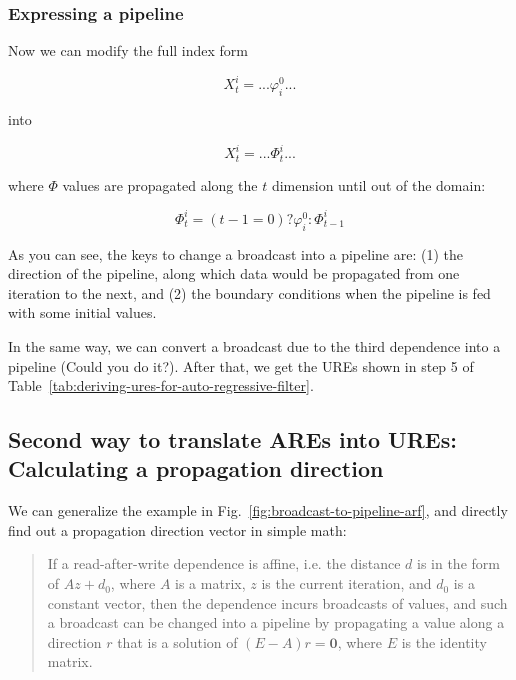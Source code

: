 \subsubsection{Expressing a pipeline} 
\label{sec:express-pipeline}

Now we can modify the full index form

\begin{equation}
X_t^i=...\varphi_i^0...
\end{equation}

into

\begin{equation}
X_t^i=...\Phi_t^i...
\end{equation}

where $\Phi$ values are propagated along the $t$ dimension until out of the domain:

\begin{equation}
\Phi_t^i=(t-1=0) ? \varphi_i^0 : \Phi_{t-1}^i
\end{equation}

As you can see, the keys to change a broadcast into a pipeline are: (1) the direction of the pipeline, along which data would be propagated from one iteration to the next, and (2) the boundary conditions when the pipeline is fed with some initial values.  

In the same way, we can convert a broadcast due to the third dependence into a pipeline (Could you do it?). After that, we get the UREs shown in step 5 of  Table~\ref{tab:deriving-ures-for-auto-regressive-filter}.

\subsection{Second way to translate AREs into UREs: Calculating a propagation direction}
\label{sec:are-to-ures-with-math}

We can generalize the example in Fig.~\ref{fig:broadcast-to-pipeline-arf}, and directly find out a propagation direction vector in simple math: 

\begin{quotation}
\noindent If a read-after-write dependence is affine, i.e. the distance $d$ is in the form of $Az+d_0$, where $A$ is a matrix, $z$ is the current iteration, and $d_0$ is a constant vector, then the dependence incurs broadcasts of values, and such a broadcast can be changed into a pipeline by propagating a value along a direction $r$ that is a solution of $(E-A)r=\mathbf{0}$, where $E$ is the identity matrix.
\end{quotation}


